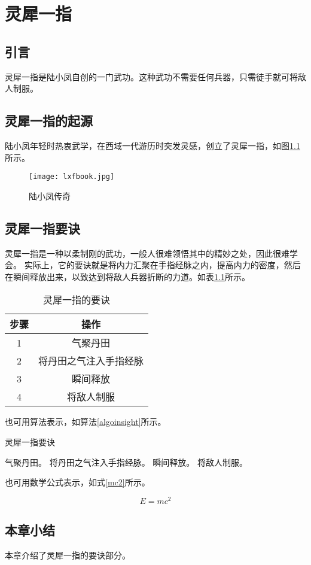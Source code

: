 \chapter{灵犀一指}

	\section{引言}
		灵犀一指是陆小凤自创的一门武功。这种武功不需要任何兵器，只需徒手就可将敌人制服。

	\section{灵犀一指的起源}
		陆小凤年轻时热衷武学，在西域一代游历时突发灵感，创立了灵犀一指，如图\ref{lxfbook}所示。

		\begin{figure}
			\centering
			\texttt{[image: lxfbook.jpg]}
			\caption{陆小凤传奇\label{lxfbook}}
		\end{figure}

	\section{灵犀一指要诀}
		灵犀一指是一种以柔制刚的武功，一般人很难领悟其中的精妙之处，因此很难学会。\cite{lxf:a} 实际上，它的要诀就是将内力汇聚在手指经脉之内，提高内力的密度，然后在瞬间释放出来，以致达到将敌人兵器折断的力道。如表\ref{lxfinsight}所示。

		\begin{table}
			\centering
			\caption{灵犀一指的要诀\label{lxfinsight}}
			\begin{tabular}{|c||c|}
				\hline
				步骤 & 操作\\
				\hline\hline
				1 &  气聚丹田\\
				\hline
				2 & 将丹田之气注入手指经脉\\
				\hline
				3 & 瞬间释放\\
				\hline
				4 & 将敌人制服\\
				\hline
			\end{tabular}
		\end{table}

		也可用算法表示，如算法\ref{algoinsight}所示。

		\begin{algorithm}
			\caption{\label{algoinsight}灵犀一指要诀}
			\begin{algorithmic}[1]
				\STATE 气聚丹田。
				\STATE 将丹田之气注入手指经脉。
				\STATE 瞬间释放。
				\STATE 将敌人制服。
			\end{algorithmic}
		\end{algorithm}

		也可用数学公式表示，如式\ref{mc2}所示。
		
		\begin{equation}
			E=mc^2
			\label{mc2}
		\end{equation}

	\section{本章小结}
		本章介绍了灵犀一指的要诀部分。
